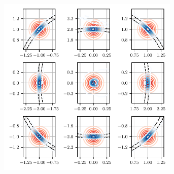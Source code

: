 
\begin{figure}[h!]
\centering

    \begin{subfigure}[t]{0.48\textwidth}
    \centering
        \includegraphics[width=0.95\textwidth]{figures/RNF_cluster_2019_09_26_12_27_27/RNF_density_array_1balls_00_00000_line.pdf}
        \vspace*{-0.2cm}
        \caption{}
        \label{fig:ring:space}
    \end{subfigure}%


\end{figure}
